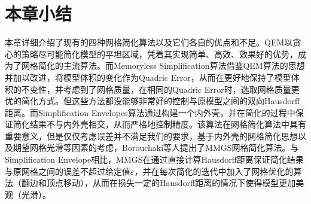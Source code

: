 \section{本章小结}
本章详细介绍了现有的四种网格简化算法以及它们各自的优点和不足。QEM\cite{qem1}\cite{qem2}以贪心的策略尽可能简化模型的平坦区域，凭着其实现简单、高效、效果好的优势，成为了网格简化的主流算法。而Memoryless Simplification算法\cite{memory-less}借鉴QEM算法的思想并加以改进，将模型体积的变化作为Quadric Error，从而在更好地保持了模型体积的不变性，并考虑到了网格质量，在相同的Quadric Error时，选取网格质量更优的简化方式。但这些方法都没能够非常好的控制与原模型之间的双向Hausdorff距离。而Simplification Envelopes算法\cite{simp-envlop}通过构建一个内外壳，并在简化的过程中保证简化结果不与内外壳相交，从而严格地控制精度。该算法在网格简化算法中具有重要意义，但是仅仅考虑误差并不满足我们的要求，基于内外壳的网格简化思想以及期望网格光滑等因素的考虑，Borouchaki等人提出了MMGS网格简化算法\cite{mmgs}。与Simplification Envelope相比，MMGS在通过直接计算Hausdorff距离保证简化结果与原网格之间的误差不超过给定值$\varepsilon$，并在每次简化的迭代中加入了网格优化的算法（翻边和顶点移动），从而在损失一定的Hausdorff距离的情况下使得模型更加美观（光滑）。
